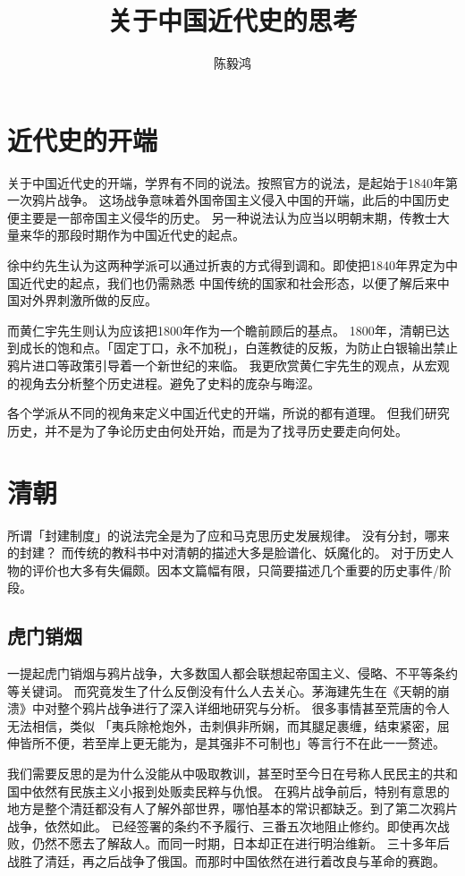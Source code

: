 \documentclass[12pt]{article}
\title{关于中国近代史的思考}
\author{陈毅鸿}
\date{}
\begin{document}
\maketitle

\section{近代史的开端}
关于中国近代史的开端，学界有不同的说法。按照官方的说法，是起始于1840年第一次鸦片战争。
这场战争意味着外国帝国主义侵入中国的开端，此后的中国历史便主要是一部帝国主义侵华的历史\cite{yue:2008wk}。
另一种说法认为应当以明朝末期，传教士大量来华的那段时期作为中国近代史的起点。

徐中约先生认为这两种学派可以通过折衷的方式得到调和。即使把1840年界定为中国近代史的起点，我们也仍需熟悉
中国传统的国家和社会形态，以便了解后来中国对外界刺激所做的反应。

而黄仁宇先生则认为应该把1800年作为一个瞻前顾后的基点\cite{Huang:1997tj}。
1800年，清朝已达到成长的饱和点。「固定丁口，永不加税」，白莲教徒的反叛，为防止白银输出禁止鸦片进口等政策引导着一个新世纪的来临。
我更欣赏黄仁宇先生的观点，从宏观的视角去分析整个历史进程。避免了史料的庞杂与晦涩。

各个学派从不同的视角来定义中国近代史的开端，所说的都有道理。
但我们研究历史，并不是为了争论历史由何处开始，而是为了找寻历史要走向何处。
\section{清朝}
所谓「封建制度」的说法完全是为了应和马克思历史发展规律。
没有分封，哪来的封建？
而传统的教科书中对清朝的描述大多是脸谱化、妖魔化的。
对于历史人物的评价也大多有失偏颇。因本文篇幅有限，只简要描述几个重要的历史事件/阶段。
\subsection{虎门销烟}
一提起虎门销烟与鸦片战争，大多数国人都会联想起帝国主义、侵略、不平等条约等关键词。
而究竟发生了什么反倒没有什么人去关心。茅海建先生在《天朝的崩溃》中对整个鸦片战争进行了深入详细地研究与分析。
很多事情甚至荒唐的令人无法相信，类似
「夷兵除枪炮外，击刺俱非所娴，而其腿足裹缠，结束紧密，屈伸皆所不便，若至岸上更无能为，是其强非不可制也」等言行不在此一一赘述。

我们需要反思的是为什么没能从中吸取教训，甚至时至今日在号称人民民主的共和国中依然有民族主义小报到处贩卖民粹与仇恨。
在鸦片战争前后，特别有意思的地方是整个清廷都没有人了解外部世界，哪怕基本的常识都缺乏。到了第二次鸦片战争，依然如此。
已经签署的条约不予履行、三番五次地阻止修约。即使再次战败，仍然不愿去了解敌人。而同一时期，日本却正在进行明治维新。
三十多年后战胜了清廷，再之后战争了俄国。而那时中国依然在进行着改良与革命的赛跑。
\end{document}
